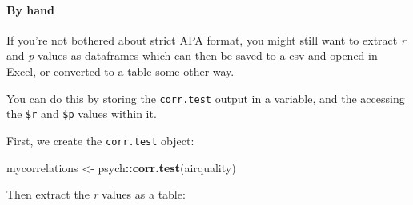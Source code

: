 \documentclass[]{article}
\newenvironment{Shaded}{\begin{snugshade}}{\end{snugshade}}
\newcommand{\ControlFlowTok}[1]{\textcolor[rgb]{0.13,0.29,0.53}{\textbf{#1}}}
\newcommand{\DecValTok}[1]{\textcolor[rgb]{0.00,0.00,0.81}{#1}}
\newcommand{\FloatTok}[1]{\textcolor[rgb]{0.00,0.00,0.81}{#1}}
\newcommand{\KeywordTok}[1]{\textcolor[rgb]{0.13,0.29,0.53}{\textbf{#1}}}
\newcommand{\NormalTok}[1]{#1}
\newcommand{\OperatorTok}[1]{\textcolor[rgb]{0.81,0.36,0.00}{\textbf{#1}}}
\newcommand{\StringTok}[1]{\textcolor[rgb]{0.31,0.60,0.02}{#1}}
\let\oldparagraph\paragraph
\renewcommand{\paragraph}[1]{\oldparagraph{#1}\mbox{}}
\begin{document}
\begin{Shaded}
\end{Shaded}

\hypertarget{by-hand}{%
\paragraph{By hand}\label{by-hand}}

If you're not bothered about strict APA format, you might still want to extract
\emph{r} and \emph{p} values as dataframes which can then be saved to a csv and opened in
Excel, or converted to a table some other way.

You can do this by storing the \texttt{corr.test} output in a variable, and the
accessing the \texttt{\$r} and \texttt{\$p} values within it.

First, we create the \texttt{corr.test} object:

\begin{Shaded}
\begin{Highlighting}[]
\NormalTok{mycorrelations <-}\StringTok{ }\NormalTok{psych}\OperatorTok{::}\KeywordTok{corr.test}\NormalTok{(airquality)}
\end{Highlighting}
\end{Shaded}

Then extract the \emph{r} values as a table:

\begin{Shaded}
\end{Shaded}
\end{document}
